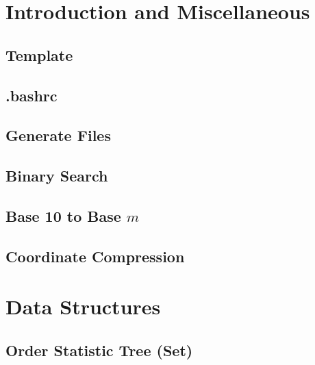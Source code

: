 \documentclass[11pt, letterpaper]{article}
\begin{document}
\pagebreak

\section{Introduction and Miscellaneous}

\subsection{Template}


\subsection{.bashrc}


\subsection{Generate Files}


\subsection{Binary Search}


\subsection{Base 10 to Base $m$}


\subsection{Coordinate Compression}


\section{Data Structures}

\subsection{Order Statistic Tree (Set)}

\end{document}
